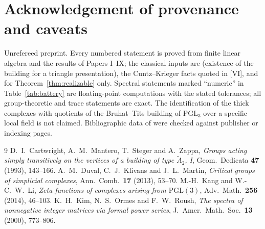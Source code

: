 \documentclass[11pt]{amsart}
\numberwithin{equation}{section}
\theoremstyle{definition}
\theoremstyle{remark}
\newcommand{\PGL}{\mathrm{PGL}}
\begin{document}
\section*{Acknowledgement of provenance and caveats}

Unrefereed preprint. Every numbered statement is proved from finite linear algebra and the
results of Papers I--IX; the classical inputs are \cite{CMSZ} (existence of the building for
a triangle presentation), the Cuntz--Krieger facts quoted in [VI], and \cite{KOR} for
Theorem~\ref{thm:realizable} only. Spectral statements marked ``numeric'' in
Table~\ref{tab:battery} are floating-point computations with the stated tolerances; all
group-theoretic and trace statements are exact. The identification of the thick complexes
with quotients of the Bruhat--Tits building of $\PGL_3$ over a specific local field is not
claimed. Bibliographic data of \cite{CMSZ,KL,KOR,DKM} were checked against publisher or
indexing pages.

\begin{thebibliography}{9}
 D.~I.~Cartwright, A.~M.~Mantero, T.~Steger and A.~Zappa, \emph{Groups acting
simply transitively on the vertices of a building of type $\widetilde A_2$, I}, Geom.\
Dedicata \textbf{47} (1993), 143--166.
 A.~M.~Duval, C.~J.~Klivans and J.~L.~Martin, \emph{Critical groups of
simplicial complexes}, Ann.\ Comb.\ \textbf{17} (2013), 53--70.
 M.-H.~Kang and W.-C.~W.~Li, \emph{Zeta functions of complexes arising from
$\mathrm{PGL}(3)$}, Adv.\ Math.\ \textbf{256} (2014), 46--103.
 K.~H.~Kim, N.~S.~Ormes and F.~W.~Roush, \emph{The spectra of nonnegative
integer matrices via formal power series}, J.\ Amer.\ Math.\ Soc.\ \textbf{13} (2000),
773--806.
\end{thebibliography}
\end{document}

